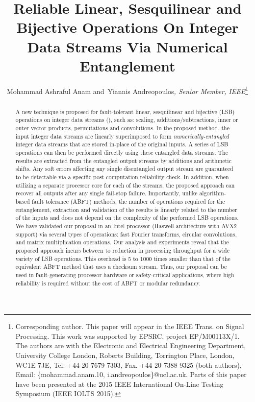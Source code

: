 \documentclass[twocolumn,english,onecolumn]{IEEEtran}
\theoremstyle{plain}
\theoremstyle{plain}
\begin{document}
\title{Reliable Linear, Sesquilinear and Bijective Operations On Integer
Data Streams Via Numerical Entanglement}


\author{Mohammad Ashraful Anam and~Yiannis Andreopoulos\emph{, Senior
Member, IEEE}\thanks{Corresponding author. This paper will appear in the IEEE Trans. on Signal Processing. This work was supported by EPSRC, project
EP/M00113X/1. The authors are with the Electronic and Electrical Engineering
Department, University College London, Roberts Building, Torrington
Place, London, WC1E 7JE, Tel. +44 20 7679 7303, Fax. +44 20 7388 9325
(both authors), Email: \{mohammad.anam.10, i.andreopoulos\}@ucl.ac.uk.
Parts of this paper have been presented at the 2015 IEEE International
On-Line Testing Symposium (IEEE IOLTS 2015). }}
\maketitle
\begin{abstract}
A new technique is proposed for fault-tolerant linear, sesquilinear
and bijective (LSB) operations on  integer data streams (),
such as: scaling, additions/subtractions, inner or outer vector products,
permutations and convolutions. In the proposed method, the  input
integer data streams are linearly superimposed to form  \emph{numerically-entangled}
integer data streams that are stored in-place of the original inputs.
A series of LSB operations can then be performed directly using these
entangled data streams. The results are extracted from the  entangled
output streams by additions and arithmetic shifts. Any soft errors
affecting any single disentangled output stream are guaranteed to
be detectable via a specific post-computation reliability check. In
addition, when utilizing a separate processor core for each of the
 streams, the proposed approach can recover all outputs after
any single fail-stop failure. Importantly, unlike algorithm-based
fault tolerance (ABFT) methods, the number of operations required
for the entanglement, extraction and validation of the results is
linearly related to the number of the inputs and does not depend on
the complexity of the performed LSB operations. We have validated
our proposal in an Intel processor (Haswell architecture with AVX2
support) via several types of operations: fast Fourier transforms,
circular convolutions, and matrix multiplication operations. Our analysis
and experiments reveal that the proposed approach incurs between 
to  reduction in processing throughput for a wide variety of
LSB operations. This overhead is 5 to 1000 times smaller than that
of the equivalent ABFT method that uses a checksum stream. Thus, our
proposal can be used in fault-generating processor hardware or safety-critical
applications, where high reliability is required without the cost
of ABFT or modular redundancy. \end{abstract}
\end{document}
